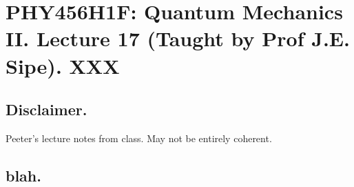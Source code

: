 
%

\chapter{PHY456H1F: Quantum Mechanics II.  Lecture 17 (Taught by Prof J.E. Sipe).  XXX}
\label{chap:qmTwoL17}
{}
\date{Nov 9, 2011}

\beginArtWithToc

\section{Disclaimer.}

Peeter's lecture notes from class.  May not be entirely coherent.

\section{blah.}

\cite{desai2009quantum}

\EndArticle

